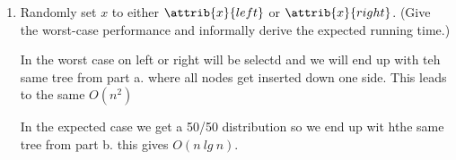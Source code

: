 \documentclass{article}
\begin{document}
\begin{description}
\begin{enumerate}
  \item Randomly set $x$ to either $\attrib{x}{left}$ or
    $\attrib{x}{right}$.  (Give the worst-case performance and
    informally derive the expected running time.)

    In the worst case on left or right will be selectd and we will end up with teh same tree from part a. where all nodes get inserted down one side. This leads to the same  $O(n^2)$

    In the expected case we get a 50/50 distribution so we end up wit hthe same tree from part b. this gives $O(n\ lg\ n)$.
  \end{enumerate}
  

\end{description}
\end{document}
